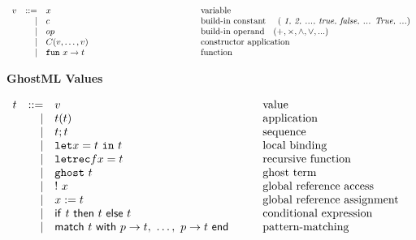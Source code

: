 \documentclass[a4paper,11pt,oneside]{article}
\begin{document}
\begin{small}
\begin{figure}[!h]
\begin{displaymath}
\begin{array}{rrl@{\hspace*{4.5cm} }l}
    v & ::= &		x		&																	\text{variable} \\
      &   | & 		c		 & 																\text{build-in constant \quad ( \textit{1, 2, ..., true, false, ... True, ...})} \\
      &   | & 		op	& 																\text{build-in operand} \quad (+, \times,  \wedge, \vee, ...) \\
      &   | & 		C(v,\dots, v) & 												\text{constructor application  }  \\
      &   | & 		\texttt{fun} \ x \rightarrow t & 					\text{function }  \\
  \end{array} 
\end{displaymath} \vspace*{-0.5cm}
\caption*{ \textbf{GhostML Values} \hfill}
\end{figure}
\label{GhostML  terms}
\begin{figure}[!h]\vspace*{-0.5cm}
\begin{displaymath}
  \begin{array}{rrl@{\quad\quad\quad}l}
   t & ::=  & v &																											\text{value} \\
      &   | & t (t) &			 																		                  \text{application} \\
       &   | & t ; t &			 																		                  \text{sequence} \\
      &   | & \texttt{let} x = t \ \texttt{in} \ t	&													\text{local binding} \\
      &   | & \texttt{letrec} f x  = t & 																		\text{recursive function} \\
      &   | & \texttt{ghost} \ t &																				\text{ghost term} \\
      &   | & !~x & 																										\text{global reference access} \\
      &   | & x := t & 																									\text{global reference assignment} \\
      &   | & \mathsf{if}~t~\mathsf{then}~t~\mathsf{else}~t & 						\text{conditional expression} \\
      &   | & \mathsf{match} ~ t ~ \mathsf{with} ~
         p \rightarrow t, ~\dots,~p \rightarrow t  ~ \mathsf{end}& 				    \text{pattern-matching} \\
  \end{array} 
\end{displaymath} \vspace*{-0.5cm}

\end{figure}
\end{small}
\end{document}
